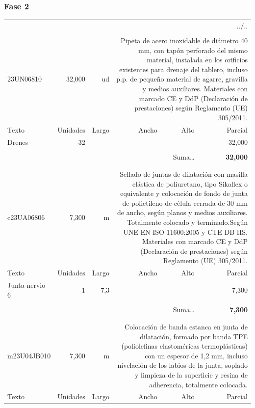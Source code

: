 \documentclass{book}%
\begin{document}
%
\subsubsection{Fase 2}%
\begin{longtable}{lrrrrr}%
\multicolumn{6}{r}{../..}\\%
\endfoot%
\endlastfoot%
&&&&&\\%
23UN06810&    32,000& ud&\multicolumn{3}{p{6cm}}{\scriptsize Pipeta de acero inoxidable de diámetro 40 mm, con tapón perforado del mismo material, instalada en los orificios existentes para drenaje del tablero, incluso p.p. de pequeño material de agarre, gravilla y medios auxiliares. Materiales con marcado CE y DdP (Declaración de prestaciones) según Reglamento (UE) 305/2011.\normalsize}\\%
Texto&Unidades&Largo&Ancho&Alto&Parcial\\%
\hline%
\multicolumn{1}{p{3.5cm}}{Drenes}&32&&&&    32,000\\%
&&&&&\\%
\multicolumn{5}{r}{Suma\ldots}&\textbf{    32,000}\\%
\hline%
&&&&&\\%
&&&&&\\%
c23UA06806&     7,300& m&\multicolumn{3}{p{6cm}}{\scriptsize Sellado de juntas de dilatación con masilla elástica de poliuretano, tipo Sikaflex o equivalente y colocación de fondo de junta de polietileno de célula cerrada de 30 mm de ancho, según planos y medios auxiliares. Totalmente colocado y terminado.Según UNE-EN ISO 11600:2005 y CTE DB-HS. Materiales con marcado CE y DdP (Declaración de prestaciones) según Reglamento (UE) 305/2011.\normalsize}\\%
Texto&Unidades&Largo&Ancho&Alto&Parcial\\%
\hline%
\multicolumn{1}{p{3.5cm}}{Junta nervio 6}&1&7,3&&&     7,300\\%
&&&&&\\%
\multicolumn{5}{r}{Suma\ldots}&\textbf{     7,300}\\%
\hline%
&&&&&\\%
&&&&&\\%
m23U04JB010&     7,300& m&\multicolumn{3}{p{6cm}}{\scriptsize Colocación de banda estanca en junta de dilatación, formado por banda TPE (poliolefinas elastoméricas termoplásticas) con un espesor de 1,2 mm, incluso nivelación de los labios de la junta, soplado y limpieza de la superficie y resina de adherencia, totalmente colocada.\normalsize}\\%
Texto&Unidades&Largo&Ancho&Alto&Parcial\\%

\end{longtable}
\end{document}
